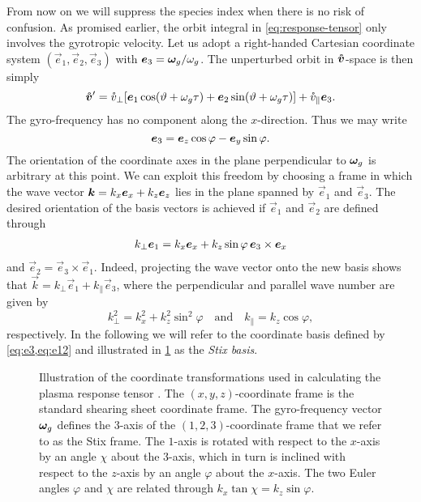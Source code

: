 \documentclass[aps,pre,notitlepage,amsmath,amssymb,amsfonts,nobibnotes,nofootinbib,superscriptaddress]{revtex4-1}
\begin{document}
From now on we will suppress the species index when there is no risk of
confusion. As promised earlier, the orbit integral in
\cref{eq:response-tensor} only involves the gyrotropic velocity. Let us adopt
a right-handed Cartesian coordinate system $(\vec{e}_1,\vec{e}_2,\vec{e}_3)$
with $\bm{e}_3=\bm{\omega}_g/\omega_g$. The unperturbed orbit in $\bm{\mathring{v}}$-space is then
simply
\begin{equation}
  \label{eq:vcirc-tau}
  \vvc' = \vc_\perp[\vec{e}_1\cos(\vartheta + \omg\tau)
  + \vec{e}_2\sin(\vartheta + \omg\tau)] + \vc_\parallel\vec{e}_3.
\end{equation}
The gyro-frequency has no component along the $x$-direction. Thus we may write
\begin{equation}
  \label{eq:e3}
  \vec{e}_3 = \ez\cos\varphi - \ey\sin\varphi.
\end{equation}
The orientation of the coordinate axes in the plane perpendicular to $\bm{\omega}_g$
is arbitrary at this point. We can exploit this freedom by choosing a frame in
which the wave vector $\bm{k}=k_x\bm{e}_x+k_z\bm{e}_z$ lies in the plane spanned by
$\vec{e}_1$ and $\vec{e}_3$. The desired orientation of the basis vectors is
achieved if $\vec{e}_1$ and $\vec{e}_2$ are defined through
\begin{align}
  \label{eq:e12}
  k_\perp\vec{e}_1 = k_x\ex + k_z\sin\varphi\,\vec{e}_3\times\ex
\end{align}
and $\vec{e}_2=\vec{e}_3\times\vec{e}_1$. Indeed, projecting the wave vector
onto the new basis shows that $\vec{k}=k_\perp\vec{e}_1+k_\parallel\vec{e}_3$,
where the perpendicular and parallel wave number are given by
\begin{equation}
  k_\perp^2 = k_x^2 + k_z^2\sin^2\varphi
  \quad\textrm{and}\quad
  k_\parallel = k_z\cos\varphi,
\end{equation}
respectively. In the following we will refer to the coordinate basis defined
by \cref{eq:e3,eq:e12} and illustrated in \cref{fig:stix} as the \emph{Stix
basis}.

\begin{figure}
  \centering
  
  \caption{Illustration of the coordinate transformations
     used in calculating the plasma response tensor
    . The $(x,y,z)$-coordinate frame
    is the standard shearing sheet coordinate frame. The gyro-frequency vector
    $\bm{\omega}_g$ defines the $3$-axis of the $(1,2,3)$-coordinate frame that we
    refer to as the Stix frame. The $1$-axis is rotated with respect to the
    $x$-axis by an angle $\chi$ about the $3$-axis, which in turn is
    inclined with respect to the $z$-axis by an angle $\varphi$ about the
    $x$-axis. The two Euler angles $\varphi$ and $\chi$ are related through
    $k_x\tan\chi=k_z\sin\varphi$.}\label{fig:stix}
\end{figure}
\end{document}
